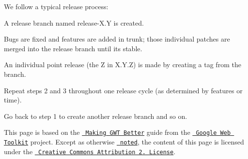 We follow a typical release process\+:


\begin{DoxyEnumerate}
\item A release branch named {\ttfamily release-\/\+X.\+Y} is created.
\end{DoxyEnumerate}
\begin{DoxyEnumerate}
\item Bugs are fixed and features are added in trunk; those individual patches are merged into the release branch until it\textquotesingle{}s stable.
\end{DoxyEnumerate}
\begin{DoxyEnumerate}
\item An individual point release (the {\ttfamily Z} in {\ttfamily X.\+Y.\+Z}) is made by creating a tag from the branch.
\end{DoxyEnumerate}
\begin{DoxyEnumerate}
\item Repeat steps 2 and 3 throughout one release cycle (as determined by features or time).
\end{DoxyEnumerate}
\begin{DoxyEnumerate}
\item Go back to step 1 to create another release branch and so on. 


\end{DoxyEnumerate}

This page is based on the \href{http://code.google.com/webtoolkit/makinggwtbetter.html}\texttt{ Making G\+WT Better} guide from the \href{http://code.google.com/webtoolkit/}\texttt{ Google Web Toolkit} project. Except as otherwise \href{http://code.google.com/policies.html#restrictions}\texttt{ noted}, the content of this page is licensed under the \href{http://creativecommons.org/licenses/by/2.5/}\texttt{ Creative Commons Attribution 2. License}. 